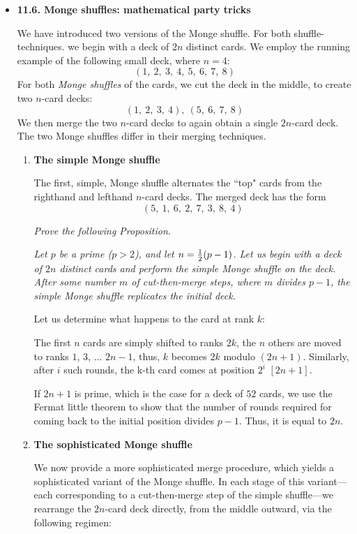 \begin{itemize}


\medskip\item
{\bf 11.6. Monge shuffles: mathematical party tricks}

\smallskip

We have introduced two versions of the Monge shuffle.
For both shuffle-techniques. we begin with a deck of $2n$ distinct cards.  
We employ the running example of the following small deck, where $n=4$:
\[ (1, \ 2, \ 3, \ 4, \ 5, \ 6, \ 7, \ 8) \]
For both {\it Monge shuffles} of the cards, we cut the deck in the middle, to create two $n$-card decks:
\[ (1, \ 2, \ 3, \ 4), \ (5, \ 6, \ 7, \ 8) \]
We then merge the two $n$-card decks to again obtain a single $2n$-card deck.  The two Monge shuffles differ in their merging techniques.

  \begin{enumerate}
  \item 
  {\bf The simple Monge shuffle}

\smallskip

The first, simple, Monge shuffle alternates the ``top" cards from the righthand and lefthand $n$-card decks. 
The merged deck has the form
\[ (5, \ 1, \ 6, \ 2, \ 7, \ 3, \ 8, \ 4) \]

{\em Prove the following Proposition.}

{\em Let $p$ be a prime ($p>2$), and let $n = {1 \over 2} (p-1)$.  
Let us begin with a deck of $2n$ distinct cards and perform the simple Monge shuffle on the deck.  
After some number $m$ of cut-then-merge steps, where $m$ divides $p-1$, the simple Monge shuffle replicates the initial deck.}
\smallskip

Let us determine what happens to the card at rank $k$:

The first $n$ cards are simply shifted to ranks $2k$, the $n$ others are moved to ranks $1$, $3$, ... $2n-1$,
thus, $k$ becomes $2k$ modulo $(2n+1)$. 
Similarly, after $i$ such rounds, the k-th card comes at position $2^i$ $[2n+1]$. 

If $2n+1$ is prime, which is the case for a deck of $52$ cards, 
we use the Fermat little theorem to show that the number of rounds required for coming back to the initial position 
divides $p-1$.
Thus, it is equal to $2n$. 

\medskip
\item {\bf The sophisticated Monge shuffle}
\smallskip

We now provide a more sophisticated merge procedure, which yields a sophisticated variant of the Monge shuffle. 
In each stage of this variant---each corresponding to a cut-then-merge step of the simple shuffle---we rearrange the $2n$-card deck directly, from the middle outward, via the following regimen:
\smallskip


\end{enumerate}
\end{itemize}
